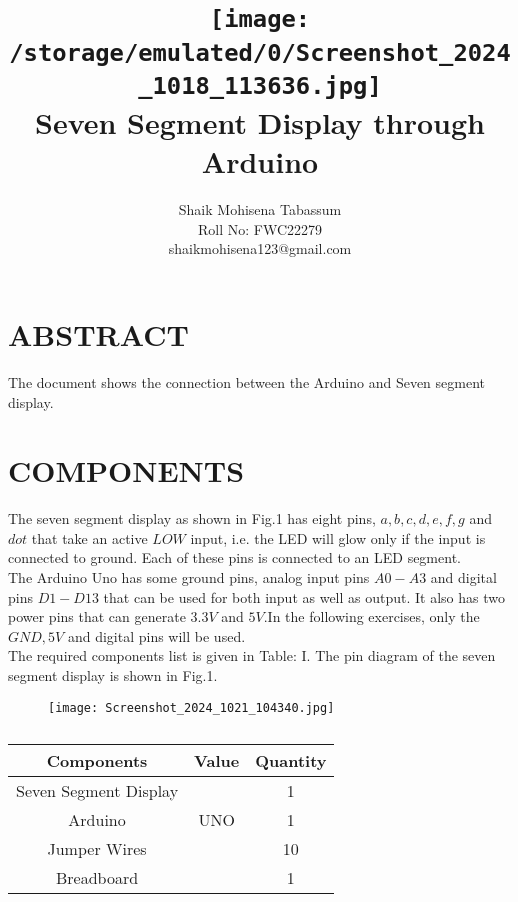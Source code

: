 \documentclass[conference]{IEEEtran}
\title{
\vspace{1cm}
{\texttt{[image: /storage/emulated/0/Screenshot\_2024\_1018\_113636.jpg]} \\ Seven Segment Display through Arduino} }
\author{Shaik Mohisena Tabassum \\ Roll No: FWC22279 \\ shaikmohisena123@gmail.com}
\begin{document}
\maketitle
 \section {ABSTRACT}
 The document shows the connection between the Arduino and Seven segment display.
\section{COMPONENTS}
The seven segment display as shown in Fig.1 has eight pins, $a, b, c, d, e, f, g$ and $dot$ that take an active $LOW$ input, i.e. the LED will glow only if the input is connected to ground. Each of these pins is connected to an LED segment. \\
The Arduino Uno has some ground pins, analog input pins $A0-A3$ and digital pins $D1-D13$ that can be used for both input as well as output. It also has two power pins that can generate $3.3V$ and $5V$.In the following exercises, only the $GND, 5V$ and digital pins will be used. \\
The required components list is given in Table: I. The pin diagram of the seven segment display is shown in Fig.1.
\begin{figure}[h]
\centering
\texttt{[image: Screenshot\_2024\_1021\_104340.jpg]}
\caption{\label{fig:Gates}}
\end{figure}
 \begin{table} [htbp]
\centering
\begin{tabular}{| c | c | c |} \hline
\textbf{Components} & \textbf{Value} & \textbf{Quantity} \\\hline
Seven Segment Display & & 1 \\ \hline
Arduino & UNO & 1 \\ \hline
Jumper Wires &  & 10 \\ \hline
Breadboard & & 1 \\ 
\hline
\end{tabular}
\vspace{0.1cm}
\caption{\label{tab:widgets}}
\end{table}
\end{document}
